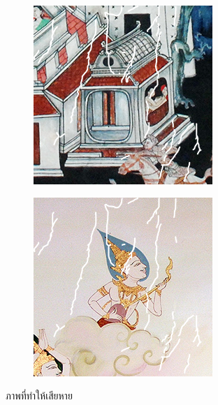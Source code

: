 \begin{figure}[H]
\begin{subfigure}{\ResultSubFigureWidth \linewidth}
	\end{subfigure}
	\begin{subfigure}{\ResultSubFigureWidth \linewidth}
		\centering
		\includegraphics[width=\ResultSubFigurePadding \linewidth]{image/thaiart/case04-toinpaint.png}			
	\end{subfigure}
	\begin{subfigure}{\ResultSubFigureWidth \linewidth}
		\centering
		\includegraphics[width=\ResultSubFigurePadding \linewidth]{image/thaiart/case05-toinpaint.png}			
	\end{subfigure}
	\caption{ภาพที่ทำให้เสียหาย}
\end{figure}